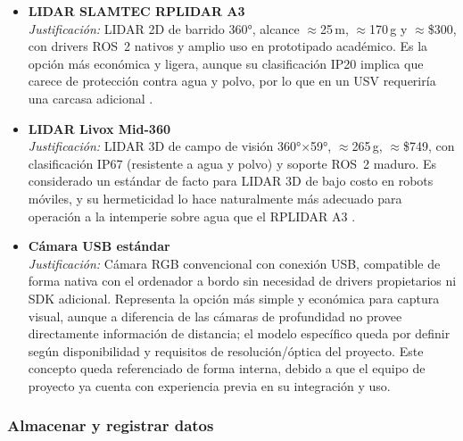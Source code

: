 \begin{itemize}
  \item \textbf{LIDAR SLAMTEC RPLIDAR A3} \\
  \textit{Justificación:} LIDAR 2D de barrido 360°, alcance $\approx$25\,m, $\approx$170\,g y 
  $\approx$\$300, con drivers ROS~2 nativos y amplio uso en prototipado académico. Es la opción 
  más económica y ligera, aunque su clasificación IP20 implica que carece de protección contra 
  agua y polvo, por lo que en un USV requeriría una carcasa adicional \cite{Cite17}. \\

  \item \textbf{LIDAR Livox Mid-360} \\
  \textit{Justificación:} LIDAR 3D de campo de visión 360°$\times$59°, $\approx$265\,g, 
  $\approx$\$749, con clasificación IP67 (resistente a agua y polvo) y soporte ROS~2 maduro. 
  Es considerado un estándar de facto para LIDAR 3D de bajo costo en robots móviles, y su 
  hermeticidad lo hace naturalmente más adecuado para operación a la intemperie sobre agua que 
  el RPLIDAR A3 \cite{Cite17}. \\

  \item \textbf{Cámara USB estándar} \\
  \textit{Justificación:} Cámara RGB convencional con conexión USB, compatible de 
  forma nativa con el ordenador a bordo sin necesidad de drivers propietarios ni SDK adicional. 
  Representa la opción más simple y económica para captura visual, aunque a diferencia de las 
  cámaras de profundidad no provee directamente información de distancia; el modelo específico 
  queda por definir según disponibilidad y requisitos de resolución/óptica del proyecto. Este concepto
  queda referenciado de forma interna, debido a que el equipo de proyecto ya cuenta con experiencia previa 
  en su integración y uso. 

\end{itemize}

\subsubsection*{Almacenar y registrar datos}

